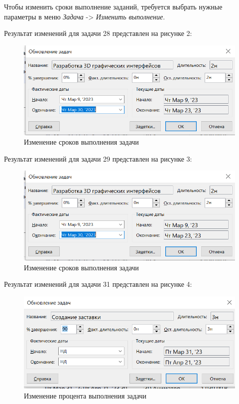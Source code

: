 Чтобы изменить сроки выполнение заданий, требуется выбрать нужные параметры в меню \textit{Задача} -> \textit{Изменить выполнение}.

Результат изменений для задачи 28 представлен на рисунке 2:
\FloatBarrier
\begin{figure}[h]	
	\begin{center}
		\includegraphics[width=\linewidth]{inc/update2.png}
	\end{center}
	\captionsetup{justification=centering}
	\caption{Изменение сроков выполнения задачи}
\end{figure}
\FloatBarrier 

\newpage
Результат изменений для задачи 29 представлен на рисунке 3:
\FloatBarrier
\begin{figure}[h]	
	\begin{center}
		\includegraphics[width=\linewidth]{inc/update2.png}
	\end{center}
	\captionsetup{justification=centering}
	\caption{Изменение сроков выполнения задачи}
\end{figure}
\FloatBarrier 

Результат изменений для задачи 31 представлен на рисунке 4:
\FloatBarrier
\begin{figure}[h]	
	\begin{center}
		\includegraphics[width=\linewidth]{inc/update3.png}
	\end{center}
	\captionsetup{justification=centering}
	\caption{Изменение процента выполнения задачи}
\end{figure}
\FloatBarrier 

